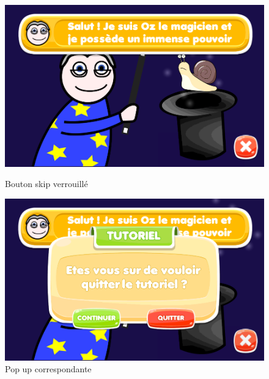 \begin{figure}[H]\centering
   \begin{minipage}{0.49\textwidth}\centering
     \includegraphics[scale=0.2]{./img/skip_locked.png}
     \caption{Bouton skip verrouillé}
     \label{skip_locked}
   \end{minipage}
   \begin {minipage}{0.49\textwidth}\centering
     \includegraphics[scale=0.2]{./img/skip_locked_popup.png}
     \caption{Pop up correspondante}
     \label{skip_locked_popup}
   \end{minipage}


\end{figure}
